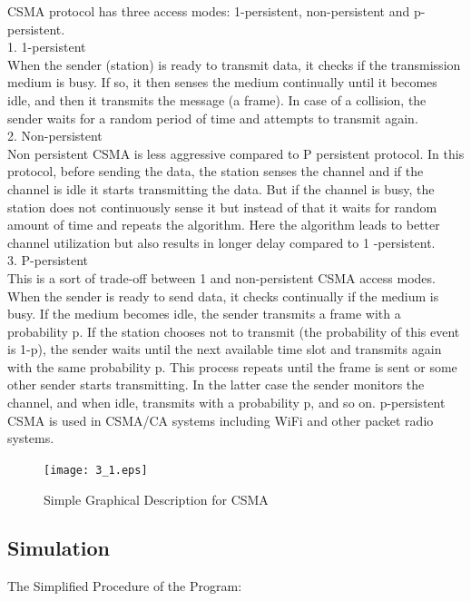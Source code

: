 \documentclass[11pt,a4paper]{report}
\begin{document}
CSMA protocol has three access modes: 1-persistent, non-persistent and p-persistent.\\

1. 1-persistent \\
When the sender (station) is ready to transmit data, it checks if the transmission medium is busy. If so, it then senses the medium continually until it becomes idle, and then it transmits the message (a frame). In case of a collision, the sender waits for a random period of time and attempts to transmit again. \\

2. Non-persistent \\
Non persistent CSMA is less aggressive compared to P persistent protocol. In this protocol, before sending the data, the station senses the channel and if the channel is idle it starts transmitting the data. But if the channel is busy, the station does not continuously sense it but instead of that it waits for random amount of time and repeats the algorithm. Here the algorithm leads to better channel utilization but also results in longer delay compared to 1 -persistent. \\

3. P-persistent \\
This is a sort of trade-off between 1 and non-persistent CSMA access modes. When the sender is ready to send data, it checks continually if the medium is busy. If the medium becomes idle, the sender transmits a frame with a probability p. If the station chooses not to transmit (the probability of this event is 1-p), the sender waits until the next available time slot and transmits again with the same probability p. This process repeats until the frame is sent or some other sender starts transmitting. In the latter case the sender monitors the channel, and when idle, transmits with a probability p, and so on. p-persistent CSMA is used in CSMA/CA systems including WiFi and other packet radio systems. \\

\begin{figure}
\centering
\texttt{[image: 3\_1.eps]}
\caption{Simple Graphical Description for CSMA}
\end{figure}

\subsection*{Simulation}
The Simplified Procedure of the Program: \\
\end{document}
